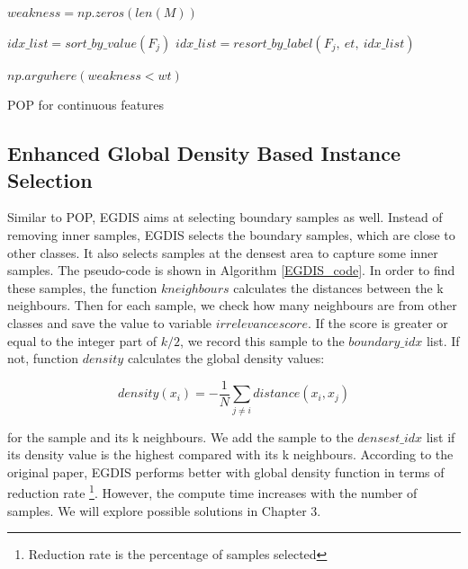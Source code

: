 \begin{algorithm}[H]
\label{pop_psudo}
 

$weakness = np.zeros(len(M))$ \;

 {
	 $idx\_list = sort\_by\_value(F_j)$ \;
	 $idx\_list = resort\_by\_label(F_j,\ et,\ idx\_list)$ \;
	 
	  {
	 }
}

\Return $np.argwhere(weakness < wt)$ \;

\caption{POP for continuous features}
\end{algorithm}




\subsection{Enhanced Global Density Based Instance Selection}
Similar to POP, EGDIS \cite{Malhat2020} aims at selecting boundary samples as well. Instead of removing inner samples,
EGDIS selects the boundary samples, which are close to other classes. It also selects samples at the densest area to capture some inner samples. The pseudo-code is shown in Algorithm \ref{EGDIS_code}. In order to find these samples, the function $kneighbours$ calculates the distances between the k neighbours. Then for each sample, we check how many neighbours are from other classes and save the value to variable $irrelevance score$. If the score is greater or equal to the integer part of $k/2$, we record this sample to the $boundary\_idx$ list. If not, function $density$ calculates the global density values:


\begin{equation}
	density(x_i) = -\frac{1}{N}\sum_{j\neq i}{distance(x_i, x_j)}
\end{equation} 

for the sample and its k neighbours. We add the sample to the $densest\_idx$ list if its density value is the highest compared with its k neighbours. According to the original paper, EGDIS performs better with global density function in terms of reduction rate \footnote{Reduction rate is the percentage of samples selected}. However, the compute time increases with the number of samples. We will explore possible solutions in Chapter 3.
 


